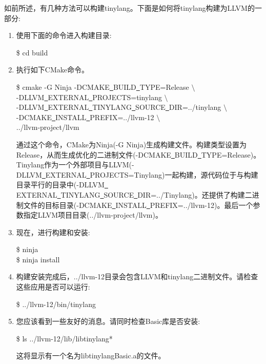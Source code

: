 如前所述，有几种方法可以构建tinylang。下面是如何将tinylang构建为LLVM的一部分:\par

\begin{enumerate}
\item 使用下面的命令进入构建目录:
	\begin{tcolorbox}[colback=white,colframe=black]
	\$ cd build
	\end{tcolorbox}

\item 执行如下CMake命令。
	\begin{tcolorbox}[colback=white,colframe=black]
	\$ cmake -G Ninja -DCMAKE\underline{~}BUILD\underline{~}TYPE=Release $\setminus$ \\
	\hspace*{1cm}-DLLVM\underline{~}EXTERNAL\underline{~}PROJECTS=tinylang $\setminus$ \\
	\hspace*{1cm}-DLLVM\underline{~}EXTERNAL\underline{~}TINYLANG\underline{~}SOURCE\underline{~}DIR=../tinylang $\setminus$ \\
	\hspace*{1cm}-DCMAKE\underline{~}INSTALL\underline{~}PREFIX=../llvm-12 $\setminus$ \\
	\hspace*{1cm}../llvm-project/llvm
	\end{tcolorbox}
	通过这个命令，CMake为Ninja(-G Ninja)生成构建文件。构建类型设置为Release，从而生成优化的二进制文件(-DCMAKE\underline{~}BUILD\underline{~}TYPE=Release)。Tinylang作为一个外部项目与LLVM(-DLLVM\underline{~}EXTERNAL\underline{~}PROJECTS=Tinylang)一起构建，源代码位于与构建目录平行的目录中(-DLLVM\underline{~} EXTERNAL\underline{~}TINYLANG\underline{~}SOURCE\underline{~}DIR=../Tinylang)。还提供了构建二进制文件的目标目录(-DCMAKE\underline{~}INSTALL\underline{~}PREFIX=../llvm-12)。最后一个参数指定LLVM项目目录(../llvm-project/llvm)。
	
\item 现在，进行构建和安装:
\begin{tcolorbox}[colback=white,colframe=black]
\$ ninja \\
\$ ninja install
\end{tcolorbox}

\item 构建安装完成后，../llvm-12目录会包含LLVM和tinylang二进制文件。请检查这些应用是否可以运行:
\begin{tcolorbox}[colback=white,colframe=black]
\$ ../llvm-12/bin/tinylang
\end{tcolorbox}

\item 您应该看到一些友好的消息。请同时检查Basic库是否安装:
\begin{tcolorbox}[colback=white,colframe=black]
	\$ ls ../llvm-12/lib/libtinylang*
\end{tcolorbox}
这将显示有一个名为libtinylangBasic.a的文件。

\end{enumerate}

